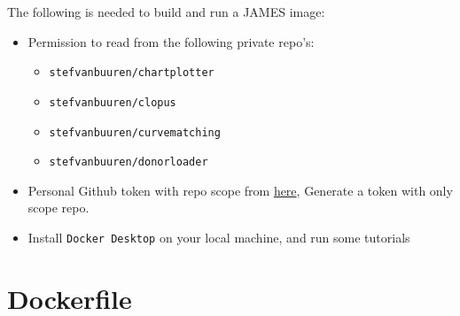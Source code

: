 \documentclass[]{book}
\providecommand{\tightlist}{%
  \setlength{\itemsep}{0pt}\setlength{\parskip}{0pt}}
\begin{document}
The following is needed to build and run a JAMES image:

\begin{itemize}
\item
  Permission to read from the following private repo's:

  \begin{itemize}
  \tightlist
  \item
    \texttt{stefvanbuuren/chartplotter}
  \item
    \texttt{stefvanbuuren/clopus}
  \item
    \texttt{stefvanbuuren/curvematching}
  \item
    \texttt{stefvanbuuren/donorloader}
  \end{itemize}
\item
  Personal Github token with repo scope from \href{https://help.github.com/en/github/authenticating-to-github/creating-a-personal-access-token-for-the-command-line}{here}, Generate a token with only scope repo.
\item
  Install \texttt{Docker\ Desktop} on your local machine, and run some tutorials
\end{itemize}

\hypertarget{dockerfile}{%
\section{Dockerfile}\label{dockerfile}}
\end{document}
